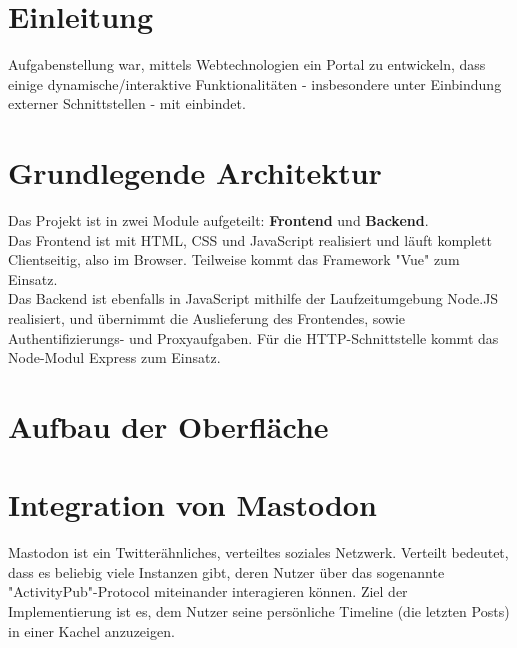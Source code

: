 \documentclass[fleqn,10pt]{SelfArx} %
\affiliation{\textsuperscript{1}\textit{Studiengang Informationstechnik, Fakultät Technik, Duale Schule Baden-Württemberg, Stuttgart}} %
\begin{document}
\flushbottom %

\maketitle %

\tableofcontents %

\thispagestyle{empty} %


\section*{Einleitung} %

Aufgabenstellung war, mittels Webtechnologien ein Portal zu entwickeln, dass einige dynamische/interaktive Funktionalitäten - insbesondere unter Einbindung externer Schnittstellen - mit einbindet. 

\section{Grundlegende Architektur}
Das Projekt ist in zwei Module aufgeteilt: \textbf{Frontend} und \textbf{Backend}. \\ Das Frontend ist mit HTML, CSS und JavaScript realisiert und läuft komplett Clientseitig, also im Browser. Teilweise kommt das Framework "Vue" zum Einsatz. \\ Das Backend ist ebenfalls in JavaScript mithilfe der Laufzeitumgebung Node.JS realisiert, und übernimmt die Auslieferung des Frontendes, sowie Authentifizierungs- und Proxyaufgaben. Für die HTTP-Schnittstelle kommt das Node-Modul Express zum Einsatz.
\section{Aufbau der Oberfläche}
\section{Integration von Mastodon}
Mastodon ist ein Twitterähnliches, verteiltes soziales Netzwerk. Verteilt bedeutet, dass es beliebig viele Instanzen gibt, deren Nutzer über das sogenannte "ActivityPub"-Protocol miteinander interagieren können. Ziel der Implementierung ist es, dem Nutzer seine persönliche Timeline (die letzten Posts) in einer Kachel anzuzeigen.
\end{document}
